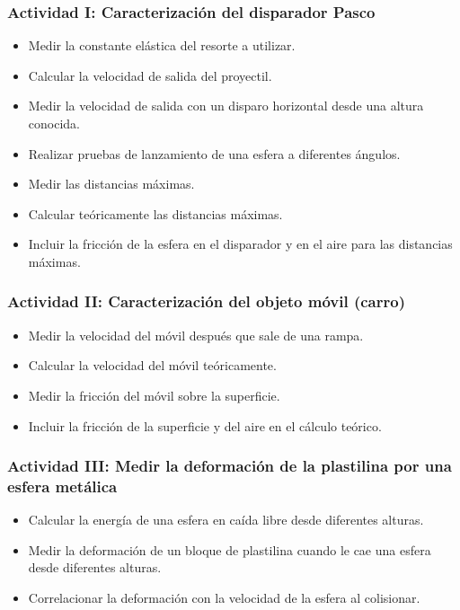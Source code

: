 \documentclass[12pt]{article}
\begin{document}
\subsubsection{Actividad I: Caracterización del disparador Pasco}

\begin{itemize}
    \item Medir la constante elástica del resorte a utilizar.
    \item Calcular la velocidad de salida del proyectil.
    \item Medir la velocidad de salida con un disparo horizontal desde una altura conocida.
    \item Realizar pruebas de lanzamiento de una esfera a diferentes ángulos.
    \item Medir las distancias máximas.
    \item Calcular teóricamente las distancias máximas.
    \item Incluir la fricción de la esfera en el disparador y en el aire para las distancias máximas.
\end{itemize}

\subsubsection{Actividad II: Caracterización del objeto móvil (carro)}

\begin{itemize}
    \item Medir la velocidad del móvil después que sale de una rampa.
    \item Calcular la velocidad del móvil teóricamente.
    \item Medir la fricción del móvil sobre la superficie.
    \item Incluir la fricción de la superficie y del aire en el cálculo teórico.
\end{itemize}

\subsubsection{Actividad III: Medir la deformación de la plastilina por una esfera metálica}

\begin{itemize}
    \item Calcular la energía de una esfera en caída libre desde diferentes alturas.
    \item Medir la deformación de un bloque de plastilina cuando le cae una esfera desde diferentes alturas.
    \item Correlacionar la deformación con la velocidad de la esfera al colisionar.
\end{itemize}
\end{document}
